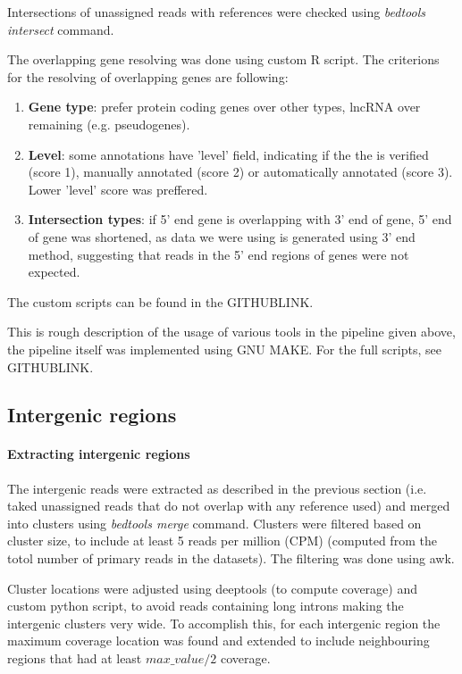 Intersections of unassigned reads with references were checked using \textit{bedtools intersect} command.

The overlapping gene resolving was done using custom R script.
The criterions for the resolving of overlapping genes are following:
\begin{enumerate}
  \item \textbf{Gene type}: prefer protein coding genes over other types, lncRNA over remaining (e.g. pseudogenes).
  \item \textbf{Level}: some annotations have 'level' field, indicating if the the is verified (score 1), manually annotated (score 2)
  or automatically annotated (score 3). Lower 'level' score was preffered.
  \item \textbf{Intersection types}: if 5' end gene is overlapping with 3' end of gene, 5' end of gene was shortened,
  as data we were using is generated using 3' end method, suggesting that reads in the 5' end regions of genes were not expected.
\end{enumerate}
The custom scripts can be found in the GITHUBLINK.


This is rough description of the usage of various tools in the pipeline given above, the pipeline itself was implemented using GNU MAKE.
For the full scripts, see GITHUBLINK.

\subsection{Intergenic regions}

\paragraph{Extracting intergenic regions}

The intergenic reads were extracted as described in the previous section (i.e. taked unassigned reads that do not overlap with any reference used)
and merged into clusters using \textit{bedtools merge} command.
Clusters were filtered based on cluster size, to include at least 5 reads per million (CPM)
(computed from the totol number of primary reads in the datasets).
The filtering was done using awk.

Cluster locations were adjusted using deeptools (to compute coverage) and custom python script,
to avoid reads containing long introns making the intergenic clusters very wide.
To accomplish this, for each intergenic region the maximum coverage location was found and extended to include neighbouring regions that had
at least $ max\_value / 2$ coverage.

